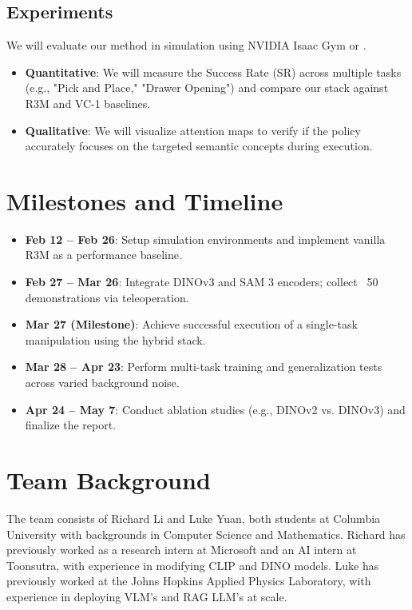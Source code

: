 \documentclass[conference]{IEEEtran}
\begin{document}
\subsection{Experiments}
We will evaluate our method in simulation using NVIDIA Isaac Gym or \cite{zhu2025robosuitemodularsimulationframework}.
\begin{itemize}
    \item \textbf{Quantitative}: We will measure the Success Rate (SR) across multiple tasks (e.g., "Pick and Place," "Drawer Opening") and compare our stack against R3M and VC-1 baselines.
    \item \textbf{Qualitative}: We will visualize attention maps to verify if the policy accurately focuses on the targeted semantic concepts during execution.
\end{itemize}

\section{Milestones and Timeline}
\begin{itemize}
    \item \textbf{Feb 12 – Feb 26}: Setup simulation environments and implement vanilla R3M as a performance baseline.
    \item \textbf{Feb 27 – Mar 26}: Integrate DINOv3 and SAM 3 encoders; collect ~50 demonstrations via teleoperation.
    \item \textbf{Mar 27 (Milestone)}: Achieve successful execution of a single-task manipulation using the hybrid stack.
    \item \textbf{Mar 28 – Apr 23}: Perform multi-task training and generalization tests across varied background noise.
    \item \textbf{Apr 24 – May 7}: Conduct ablation studies (e.g., DINOv2 vs. DINOv3) and finalize the report.
\end{itemize}

\section{Team Background}
The team consists of Richard Li and Luke Yuan, both students at Columbia University with backgrounds in Computer Science and Mathematics. Richard has previously worked as a research intern at Microsoft and an AI intern at Toonsutra, with experience in modifying CLIP and DINO models. Luke has previously worked at the Johns Hopkins Applied Physics Laboratory, with experience in deploying VLM's and RAG LLM's at scale.



\end{document}
